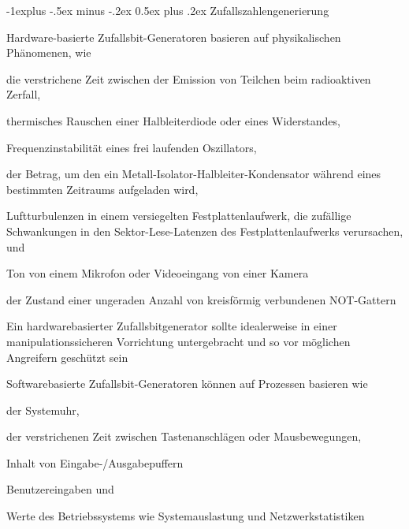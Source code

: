 \documentclass[a4paper]{article}
\makeatletter
\renewcommand{\subsection}{\@startsection{subsection}{2}{0mm}%
 {-1explus -.5ex minus -.2ex}%
 {0.5ex plus .2ex}%
 {\normalfont\normalsize\bfseries}}
\makeatother
\begin{document}
\begin{multicols}{3}
      \subsection{Zufallszahlengenerierung}
      \begin{itemize*}
            \item Hardware-basierte Zufallsbit-Generatoren basieren auf physikalischen Phänomenen, wie
            \begin{itemize*}
                  \item die verstrichene Zeit zwischen der Emission von Teilchen beim radioaktiven Zerfall,
                  \item thermisches Rauschen einer Halbleiterdiode oder eines Widerstandes,
                  \item Frequenzinstabilität eines frei laufenden Oszillators,
                  \item der Betrag, um den ein Metall-Isolator-Halbleiter-Kondensator während eines bestimmten Zeitraums aufgeladen wird,
                  \item Luftturbulenzen in einem versiegelten Festplattenlaufwerk, die zufällige Schwankungen in den Sektor-Lese-Latenzen des Festplattenlaufwerks verursachen, und
                  \item Ton von einem Mikrofon oder Videoeingang von einer Kamera
                  \item der Zustand einer ungeraden Anzahl von kreisförmig verbundenen NOT-Gattern
            \end{itemize*}
            \item Ein hardwarebasierter Zufallsbitgenerator sollte idealerweise in einer manipulationssicheren Vorrichtung untergebracht und so vor möglichen Angreifern geschützt sein
            \item Softwarebasierte Zufallsbit-Generatoren können auf Prozessen basieren wie
            \begin{itemize*}
                  \item der Systemuhr,
                  \item der verstrichenen Zeit zwischen Tastenanschlägen oder Mausbewegungen,
                  \item Inhalt von Eingabe-/Ausgabepuffern
                  \item Benutzereingaben und
                  \item Werte des Betriebssystems wie Systemauslastung und Netzwerkstatistiken
            \end{itemize*}

\end{itemize*}
\end{multicols}
\end{document}
